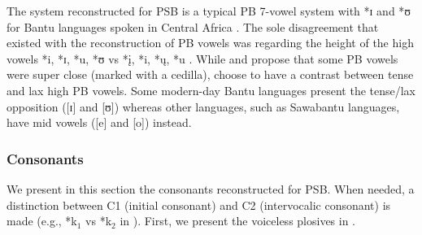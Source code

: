 \documentclass[output=paper,colorlinks,citecolor=brown
]{langscibook}
\begin{document}
The system reconstructed for PSB is a typical PB 7-vowel system with *ɪ and *ʊ for Bantu languages spoken in Central Africa \citep{guthriecomparativebantu, meeussen1967, bastinetal2002}. The sole disagreement that existed with the reconstruction of PB vowels was regarding the height of the high vowels *i, *ɪ, *u, *ʊ \citep{bastinetal2002} vs *į, *i, *ų, *u \citep{guthriecomparativebantu, meeussen1967}. While \citet{guthriecomparativebantu} and \citet{meeussen1967} propose that some PB vowels were super close (marked with a cedilla), \citet{bastinetal2002} choose to have a contrast between tense and lax high PB vowels. Some modern-day Bantu languages present the tense/lax opposition ([ɪ] and [ʊ]) whereas other languages, such as Sawabantu languages, have mid vowels ([e] and [o]) instead.

\subsubsection{Consonants} \label{sect:browngrollemundrule:consonants}

We present in this section the consonants reconstructed for PSB. When needed, a distinction between C1 (initial consonant) and C2 (intervocalic consonant) is made (e.g., *k$_1$ vs *k$_2$ in ). First, we present the voiceless plosives in . 
\end{document}
